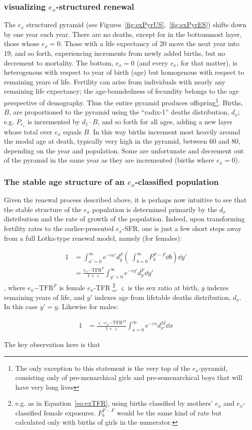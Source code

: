 \subsubsection{visualizing $e_x$-structured renewal}
The $e_x$ structured pyramid (see Figures~\ref{fig:exPyrUS},~\ref{fig:exPyrES})
shifts down by one year each year. There are no deaths, except for in 
the bottommost layer, those whose $e_x = 0$. Those with a life
expectancy of 20 move the next year into 19, and so forth, experiencing
increments from newly added births, but no decrement to mortality. The bottom,
$e_x = 0$ (and every $e_x$, for that matter), is heterogenous with 
respect to year of birth (age) but homogenous with respect to remaining 
years of life. Fertility can arise from individuals with nearly any remaining life
expectancy; the age-boundedness of fecundity belongs to the age
perspective of demography. Thus the entire pyramid produces offspring\footnote{The only exception
to this statement is the very top of the $e_x$-pyramid, consisting only of
pre-menarchical girls and pre-semenarchical boys that will have very long
lives}. Births, $B$, are proportioned to the pyramid using the ``radix-1''
deaths distribution, $d_x$; e.g. $P_{e_1}$ is incremented by $d_1 \cdot B$, and
so forth for all ages, adding a new layer whose total over $e_x$ equals $B$. In this way births
increment most heavily around the modal age at death, typically very high in the
pyramid, between 60 and 80, depending on the year and population. Some are
unfortunate and decrement out of the pyramid in the same year as they are
incremented (births where $e_x = 0$).

\subsubsection{The stable age structure of an $e_x$-classified population}
Given the renewal process described above, it is perhaps now intuitive to see
that the stable structure of the $e_x$ population is determined primarily by 
the $d_x$ distribution and the rate of growth of the
population. Indeed, upon transforming fertility rates to the earlier-presented
$e_x$-SFR, one is just a few short steps away from a full Lotka-type renewal
model, namely (for females):

\begin{align}
1 &= \int _{a' = 0}^\infty e^{-ra'} d_{y}^F \left(\;\int _{b = 0}^\infty
F_b^{F-F} \dd b\right)  \dd y' \\
&= \frac{e_x\mathrm{-TFR}^F}{1 + \varsigma} \int _{y' = 0}^\infty e^{-ry'}
d_{y}^F \dd y'
\end{align}
, where $e_x\mathrm{-TFR}^F$ is female $e_x$-TFR \footnote{e.g. as in
Equation~\eqref{eq:exTFR}, using births classified by mothers' $e_x$ and
$e_x$-classified female exposures. $F_b^{F-F}$ would be the same kind of rate
but calculated only with births of girls in the numerator.}, $\varsigma$ is the
sex ratio at birth, $y$ indexes remaining years of life, and $y'$ indexes age from lifetable deaths distribution, $d_x$. In this case $y' = y$. Likewise for males:

\begin{align}
1 &= \frac{\varsigma \cdot e_x\mathrm{-TFR}^M}{1 + \varsigma} \int _{x =
0}^\infty e^{-rx} d_{x'}^M \dd x
\end{align}

The key observation here is that






